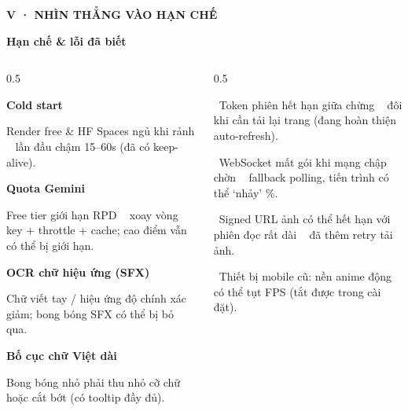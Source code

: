 \documentclass[aspectratio=169,10pt]{beamer}
\newcommand{\kick}[1]{{\headfont\bfseries\footnotesize\textcolor{mred}{\MakeUppercase{#1}}}}
\newcommand{\slidehead}[2]{%
  \kick{#1}\par\vspace{0.6mm}%
  {\headfont\bfseries\LARGE\textcolor{ink}{#2}}\par\vspace{1.2mm}}
\newcommand{\arr}{\textcolor{mred}{\,\raisebox{0.1ex}{$\rightarrow$}\,}}
\begin{document}
\begin{frame}
\slidehead{V · Nhìn thẳng vào hạn chế}{Hạn chế \& lỗi đã biết}
\vspace{0.5mm}
\begin{columns}[t]
\begin{column}{0.5\textwidth}\scriptsize
\begin{tcolorbox}[card]{\headfont\bfseries\color{mred}Cold start}\par\textcolor{slate}{Render free \& HF Spaces ngủ khi rảnh \arr\ lần đầu chậm 15–60s (đã có keep-alive).}\end{tcolorbox}\vspace{1.2mm}
\begin{tcolorbox}[card]{\headfont\bfseries\color{mred}Quota Gemini}\par\textcolor{slate}{Free tier giới hạn RPD \arr\ xoay vòng key + throttle + cache; cao điểm vẫn có thể bị giới hạn.}\end{tcolorbox}\vspace{1.2mm}
\begin{tcolorbox}[card]{\headfont\bfseries\color{mred}OCR chữ hiệu ứng (SFX)}\par\textcolor{slate}{Chữ viết tay / hiệu ứng độ chính xác giảm; bong bóng SFX có thể bị bỏ qua.}\end{tcolorbox}\vspace{1.2mm}
\begin{tcolorbox}[card]{\headfont\bfseries\color{mred}Bố cục chữ Việt dài}\par\textcolor{slate}{Bong bóng nhỏ phải thu nhỏ cỡ chữ hoặc cắt bớt (có tooltip đầy đủ).}\end{tcolorbox}
\end{column}
\begin{column}{0.5\textwidth}
\begin{tcolorbox}[darkcard,title={LỖI ĐÃ BIẾT (đang xử lý)},height=6.3cm]\footnotesize\color{white}
\textcolor{mred}{\textbullet}\ Token phiên hết hạn giữa chừng \arr\ đôi khi cần tải lại trang (đang hoàn thiện auto-refresh).\par\vspace{2.6mm}
\textcolor{mred}{\textbullet}\ WebSocket mất gói khi mạng chập chờn \arr\ fallback polling, tiến trình có thể ‘nhảy’ \%.\par\vspace{2.6mm}
\textcolor{mred}{\textbullet}\ Signed URL ảnh có thể hết hạn với phiên đọc rất dài \arr\ đã thêm retry tải ảnh.\par\vspace{2.6mm}
\textcolor{mred}{\textbullet}\ Thiết bị mobile cũ: nền anime động có thể tụt FPS (tắt được trong cài đặt).
\end{tcolorbox}
\end{column}
\end{columns}
\end{frame}
\end{document}
